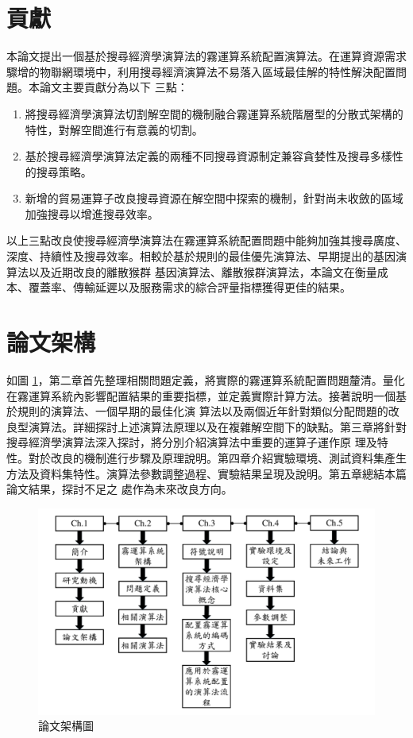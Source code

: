 \section{貢獻}
本論文提出一個基於搜尋經濟學演算法的霧運算系統配置演算法。在運算資源需求驟增的物聯網環境中，利用搜尋經濟演算法不易落入區域最佳解的特性解決配置問題。本論文主要貢獻分為以下
三點：
\begin{enumerate}
    \item 將搜尋經濟學演算法切割解空間的機制融合霧運算系統階層型的分散式架構的特性，對解空間進行有意義的切割。
    \item 基於搜尋經濟學演算法定義的兩種不同搜尋資源制定兼容貪婪性及搜尋多樣性的搜尋策略。
    \item 新增的貿易運算子改良搜尋資源在解空間中探索的機制，針對尚未收斂的區域加強搜尋以增進搜尋效率。
\end{enumerate}
以上三點改良使搜尋經濟學演算法在霧運算系統配置問題中能夠加強其搜尋廣度、深度、持續性及搜尋效率。相較於基於規則的最佳優先演算法、早期提出的基因演算法以及近期改良的離散猴群
基因演算法、離散猴群演算法，本論文在衡量成本、覆蓋率、傳輸延遲以及服務需求的綜合評量指標獲得更佳的結果。

\section{論文架構}
如圖 \ref{fig:thesis-arch}，第二章首先整理相關問題定義，將實際的霧運算系統配置問題釐清。量化在霧運算系統內影響配置結果的重要指標，並定義實際計算方法。接著說明一個基於規則的演算法、一個早期的最佳化演
算法以及兩個近年針對類似分配問題的改良型演算法。詳細探討上述演算法原理以及在複雜解空間下的缺點。第三章將針對搜尋經濟學演算法深入探討，將分別介紹演算法中重要的運算子運作原
理及特性。對於改良的機制進行步驟及原理說明。第四章介紹實驗環境、測試資料集產生方法及資料集特性。演算法參數調整過程、實驗結果呈現及說明。第五章總結本篇論文結果，探討不足之
處作為未來改良方向。
\begin{figure}[H]
    \centering
    \includegraphics[height=!,width=1\linewidth,keepaspectratio=ture]
    {figures/thesis_arch}
    \caption[論文架構圖]{\normalsize 論文架構圖}
    \label{fig:thesis-arch}
\end{figure}

